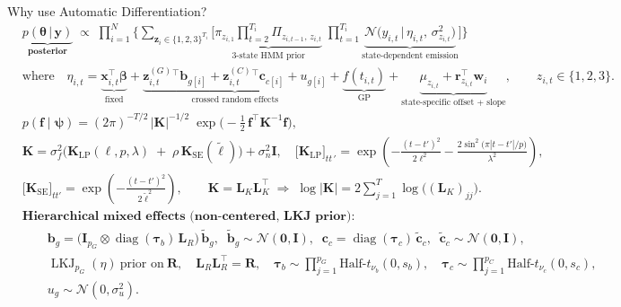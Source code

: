 \documentclass[dvipsnames]{beamer}
\begin{document}
\begin{frame}{Why use Automatic Differentiation?}
\tiny
\begin{align*}
&\underbrace{p\!\left(
\boldsymbol{\theta} \,\big|\, \mathbf y
\right)}_{\textbf{posterior}}
\;\propto\;
\prod_{i=1}^{N}
\Bigg\{
\sum_{\mathbf z_i \in \{1,2,3\}^{T_i}}
\!\Bigg[
\underbrace{\pi_{z_{i,1}}\prod_{t=2}^{T_i}\Pi_{z_{i,t-1},\,z_{i,t}}}_{\text{3-state HMM prior}}
\;
\prod_{t=1}^{T_i}
\underbrace{\mathcal N\!\Big(
y_{i,t}\,\Big|\,\eta_{i,t},\,\sigma_{z_{i,t}}^{2}
\Big)}_{\text{state-dependent emission}}
\Bigg]
\Bigg\}
\\[-2pt]
&\text{where}\quad
\eta_{i,t}
=\underbrace{\mathbf x_{i,t}^{\!\top}\boldsymbol\beta}_{\text{fixed}}
+\underbrace{\mathbf z^{(G)}_{i,t}{}^{\!\top}\mathbf b_{g[i]}
+\mathbf z^{(C)}_{i,t}{}^{\!\top}\mathbf c_{c[i]}
+u_{g[i]}}_{\text{crossed random effects}}
+\underbrace{f(t_{i,t})}_{\text{GP}}
+\underbrace{\mu_{z_{i,t}}
+\mathbf r_{z_{i,t}}^{\!\top}\mathbf w_i}_{\text{state-specific offset + slope}}
,\qquad z_{i,t}\in\{1,2,3\}.
\\[4pt]
&
p(\mathbf f\mid\boldsymbol\psi)
=
(2\pi)^{-T/2}\,|\mathbf K|^{-1/2}\;
\exp\!\Big(-\tfrac12\,\mathbf f^{\!\top}\mathbf K^{-1}\mathbf f\Big),
\\[-2pt]
&
\mathbf K
=\sigma_f^{2}\Big(\mathbf K_{\text{LP}}(\ell,p,\lambda)\;+\;\rho\,\mathbf K_{\text{SE}}(\tilde\ell)\Big)
+\sigma_n^{2}\mathbf I,\quad
\big[\mathbf K_{\text{LP}}\big]_{t t\,'}
=\exp\!\left(
-\frac{(t-t')^{2}}{2\ell^{2}}
-\frac{2\sin^{2}\!\big(\pi|t-t'|/p\big)}{\lambda^{2}}
\right),
\\[-2pt]
&
\big[\mathbf K_{\text{SE}}\big]_{t t'}
=
\exp\!\left(-\frac{(t-t')^{2}}{2\tilde\ell^{2}}\right),
\qquad
\mathbf K=\mathbf L_K\mathbf L_K^{\!\top}
\;\Rightarrow\;
\log|\mathbf K|=2\sum_{j=1}^{T}\log \big((\mathbf L_K)_{jj}\big).
\\[6pt]
&\textbf{Hierarchical mixed effects (non-centered, LKJ prior):}
\\[-2pt]
&\qquad
\mathbf b_{g}=\big(\mathbf I_{p_G}\otimes\operatorname{diag}(\boldsymbol\tau_b)\,\mathbf L_R\big)\,\tilde{\mathbf b}_{g},
\;\;
\tilde{\mathbf b}_{g}\sim\mathcal N(\mathbf 0,\mathbf I),
\;\;
\mathbf c_{c}=\operatorname{diag}(\boldsymbol\tau_c)\,\tilde{\mathbf c}_{c},
\;\;
\tilde{\mathbf c}_{c}\sim\mathcal N(\mathbf 0,\mathbf I),
\\[-2pt]
&\qquad
\operatorname{LKJ}_{p_G}(\eta)\ \text{prior on}\ \mathbf R,\quad
\mathbf L_R\mathbf L_R^{\!\top}=\mathbf R,
\quad
\boldsymbol\tau_b\sim\prod_{j=1}^{p_G}\text{Half-}t_{\nu_b}(0,s_b),
\quad
\boldsymbol\tau_c\sim\prod_{j=1}^{p_C}\text{Half-}t_{\nu_c}(0,s_c),
\\[-2pt]
&\qquad
u_g\sim\mathcal N(0,\sigma_u^2).
\end{align*}


\end{frame}
\end{document}
